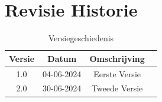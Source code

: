 \documentclass{article}
\begin{document}
  \tableofcontents
  \pagebreak 

  \section{Revisie Historie}
  \begin{table}[h]
      \centering
      \begin{tabular}{|c|c|c|p{5cm}|}
          \hline
          \textbf{Versie} & \textbf{Datum} & \textbf{Omschrijving}  \\
          \hline
          1.0  & 04-06-2024 & Eerste Versie \\
          2.0 & 30-06-2024 & Tweede Versie \\
          \hline
  
      \end{tabular}
      \caption{Versiegeschiedenis}
  \end{table}
  \pagebreak
\end{document}
